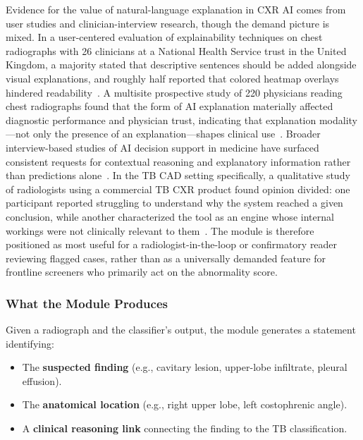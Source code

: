 \documentclass[conference, letterpaper]{IEEEtran}
\begin{document}
Evidence for the value of natural-language explanation in CXR AI comes from user studies and clinician-interview research, though the demand picture is mixed. In a user-centered evaluation of explainability techniques on chest radiographs with 26 clinicians at a National Health Service trust in the United Kingdom, a majority stated that descriptive sentences should be added alongside visual explanations, and roughly half reported that colored heatmap overlays hindered readability~\cite{ihongbe2024xai_cxr}. A multisite prospective study of 220 physicians reading chest radiographs found that the form of AI explanation materially affected diagnostic performance and physician trust, indicating that explanation modality---not only the presence of an explanation---shapes clinical use~\cite{gaube2024care_explain}. Broader interview-based studies of AI decision support in medicine have surfaced consistent requests for contextual reasoning and explanatory information rather than predictions alone~\cite{tonekaboni2019clinicians_want, cai2019hello_ai}. In the TB CAD setting specifically, a qualitative study of radiologists using a commercial TB CXR product found opinion divided: one participant reported struggling to understand why the system reached a given conclusion, while another characterized the tool as an engine whose internal workings were not clinically relevant to them~\cite{hua2025qxr_acceptability}. The module is therefore positioned as most useful for a radiologist-in-the-loop or confirmatory reader reviewing flagged cases, rather than as a universally demanded feature for frontline screeners who primarily act on the abnormality score.

\subsubsection{What the Module Produces}

Given a radiograph and the classifier's output, the module generates a statement identifying:

\begin{itemize}
    \item The \textbf{suspected finding} (e.g., cavitary lesion, upper-lobe infiltrate, pleural effusion).
    \item The \textbf{anatomical location} (e.g., right upper lobe, left costophrenic angle).
    \item A \textbf{clinical reasoning link} connecting the finding to the TB classification.
\end{itemize}
\end{document}
